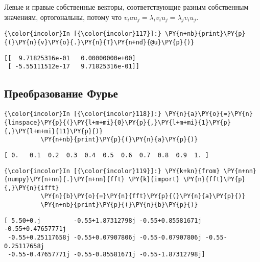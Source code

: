    Левые и правые собственные векторы, соответствующие разным собственным
значениям, ортогональны, потому что
\(v_i a u_j = \lambda_i v_i u_j = \lambda_j v_i u_j\).

    \begin{Verbatim}[commandchars=\\\{\}]
{\color{incolor}In [{\color{incolor}117}]:} \PY{n+nb}{print}\PY{p}{(}\PY{n}{v}\PY{o}{.}\PY{n}{T}\PY{n+nd}{@u}\PY{p}{)}
\end{Verbatim}

    \begin{Verbatim}[commandchars=\\\{\}]
[[  9.71825316e-01   0.00000000e+00]
 [ -5.55111512e-17   9.71825316e-01]]

    \end{Verbatim}

\subsection{Преобразование Фурье}
\label{numpy5}

    \begin{Verbatim}[commandchars=\\\{\}]
{\color{incolor}In [{\color{incolor}118}]:} \PY{n}{a}\PY{o}{=}\PY{n}{linspace}\PY{p}{(}\PY{l+m+mi}{0}\PY{p}{,}\PY{l+m+mi}{1}\PY{p}{,}\PY{l+m+mi}{11}\PY{p}{)}
          \PY{n+nb}{print}\PY{p}{(}\PY{n}{a}\PY{p}{)}
\end{Verbatim}

    \begin{Verbatim}[commandchars=\\\{\}]
[ 0.   0.1  0.2  0.3  0.4  0.5  0.6  0.7  0.8  0.9  1. ]

    \end{Verbatim}

    \begin{Verbatim}[commandchars=\\\{\}]
{\color{incolor}In [{\color{incolor}119}]:} \PY{k+kn}{from} \PY{n+nn}{numpy}\PY{n+nn}{.}\PY{n+nn}{fft} \PY{k}{import} \PY{n}{fft}\PY{p}{,}\PY{n}{ifft}
          \PY{n}{b}\PY{o}{=}\PY{n}{fft}\PY{p}{(}\PY{n}{a}\PY{p}{)}
          \PY{n+nb}{print}\PY{p}{(}\PY{n}{b}\PY{p}{)}
\end{Verbatim}

    \begin{Verbatim}[commandchars=\\\{\}]
[ 5.50+0.j         -0.55+1.87312798j -0.55+0.85581671j -0.55+0.47657771j
 -0.55+0.25117658j -0.55+0.07907806j -0.55-0.07907806j -0.55-0.25117658j
 -0.55-0.47657771j -0.55-0.85581671j -0.55-1.87312798j]

    \end{Verbatim}

